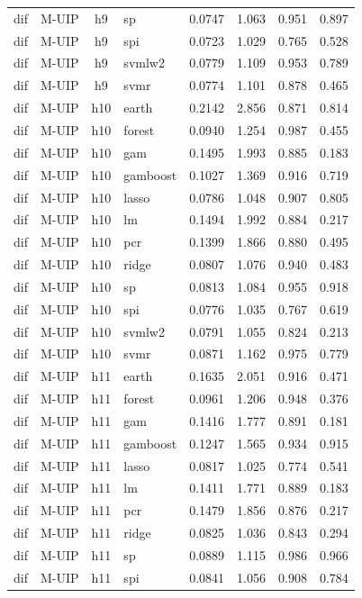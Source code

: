 \begin{ThreePartTable}
\begin{longtable}[t]{llclcccc}
dif & M-UIP & h9 & sp & 0.0747 & 1.063 & 0.951 & 0.897\\
dif & M-UIP & h9 & spi & 0.0723 & 1.029 & 0.765 & 0.528\\
dif & M-UIP & h9 & svmlw2 & 0.0779 & 1.109 & 0.953 & 0.789\\
dif & M-UIP & h9 & svmr & 0.0774 & 1.101 & 0.878 & 0.465\\
\addlinespace
dif & M-UIP & h10 & earth & 0.2142 & 2.856 & 0.871 & 0.814\\
dif & M-UIP & h10 & forest & 0.0940 & 1.254 & 0.987 & 0.455\\
dif & M-UIP & h10 & gam & 0.1495 & 1.993 & 0.885 & 0.183\\
dif & M-UIP & h10 & gamboost & 0.1027 & 1.369 & 0.916 & 0.719\\
dif & M-UIP & h10 & lasso & 0.0786 & 1.048 & 0.907 & 0.805\\
dif & M-UIP & h10 & lm & 0.1494 & 1.992 & 0.884 & 0.217\\
dif & M-UIP & h10 & pcr & 0.1399 & 1.866 & 0.880 & 0.495\\
dif & M-UIP & h10 & ridge & 0.0807 & 1.076 & 0.940 & 0.483\\
dif & M-UIP & h10 & sp & 0.0813 & 1.084 & 0.955 & 0.918\\
dif & M-UIP & h10 & spi & 0.0776 & 1.035 & 0.767 & 0.619\\
dif & M-UIP & h10 & svmlw2 & 0.0791 & 1.055 & 0.824 & 0.213\\
dif & M-UIP & h10 & svmr & 0.0871 & 1.162 & 0.975 & 0.779\\
\addlinespace
dif & M-UIP & h11 & earth & 0.1635 & 2.051 & 0.916 & 0.471\\
dif & M-UIP & h11 & forest & 0.0961 & 1.206 & 0.948 & 0.376\\
dif & M-UIP & h11 & gam & 0.1416 & 1.777 & 0.891 & 0.181\\
dif & M-UIP & h11 & gamboost & 0.1247 & 1.565 & 0.934 & 0.915\\
dif & M-UIP & h11 & lasso & 0.0817 & 1.025 & 0.774 & 0.541\\
dif & M-UIP & h11 & lm & 0.1411 & 1.771 & 0.889 & 0.183\\
dif & M-UIP & h11 & pcr & 0.1479 & 1.856 & 0.876 & 0.217\\
dif & M-UIP & h11 & ridge & 0.0825 & 1.036 & 0.843 & 0.294\\
dif & M-UIP & h11 & sp & 0.0889 & 1.115 & 0.986 & 0.966\\
dif & M-UIP & h11 & spi & 0.0841 & 1.056 & 0.908 & 0.784\\

\end{longtable}
\end{ThreePartTable}
